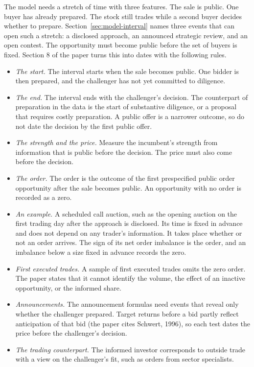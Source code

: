 The model needs a stretch of time with three features. The sale is public. One buyer has already prepared. The stock still trades while a second buyer decides whether to prepare. Section~\ref{sec:model-interval} names three events that can open such a stretch: a disclosed approach, an announced strategic review, and an open contest. The opportunity must become public before the set of buyers is fixed. Section 8 of the paper turns this into dates with the following rules.

\begin{itemize}
\item \emph{The start.} The interval starts when the sale becomes public. One bidder is then prepared, and the challenger has not yet committed to diligence.
\item \emph{The end.} The interval ends with the challenger's decision. The counterpart of preparation in the data is the start of substantive diligence, or a proposal that requires costly preparation. A public offer is a narrower outcome, so do not date the decision by the first public offer.
\item \emph{The strength and the price.} Measure the incumbent's strength from information that is public before the decision. The price must also come before the decision.
\item \emph{The order.} The order is the outcome of the first prespecified public order opportunity after the sale becomes public. An opportunity with no order is recorded as a zero.
\item \emph{An example.} A scheduled call auction, such as the opening auction on the first trading day after the approach is disclosed. Its time is fixed in advance and does not depend on any trader's information. It takes place whether or not an order arrives. The sign of its net order imbalance is the order, and an imbalance below a size fixed in advance records the zero.
\item \emph{First executed trades.} A sample of first executed trades omits the zero order. The paper states that it cannot identify the volume, the effect of an inactive opportunity, or the informed share.
\item \emph{Announcements.} The announcement formulas need events that reveal only whether the challenger prepared. Target returns before a bid partly reflect anticipation of that bid (the paper cites Schwert, 1996), so each test dates the price before the challenger's decision.
\item \emph{The trading counterpart.} The informed investor corresponds to outside trade with a view on the challenger's fit, such as orders from sector specialists.
\end{itemize}

